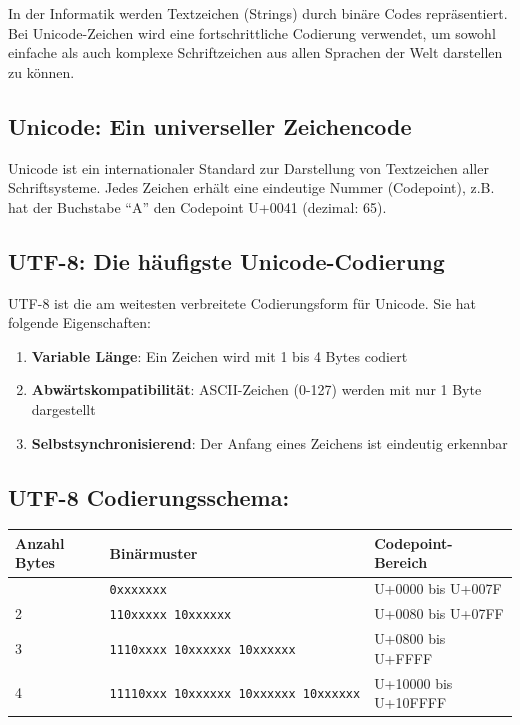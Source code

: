 \documentclass[
  nswissgerman,
  a4paper,
  DIV=11,
  numbers=noendperiod,
  ngerman]{scrreprt}
\newcounter{none} %
\providecommand{\tightlist}{%
  \setlength{\itemsep}{0pt}\setlength{\parskip}{0pt}}
\begin{document}
In der Informatik werden Textzeichen (Strings) durch binäre Codes
repräsentiert. Bei Unicode-Zeichen wird eine fortschrittliche Codierung
verwendet, um sowohl einfache als auch komplexe Schriftzeichen aus allen
Sprachen der Welt darstellen zu können.

\subsection{Unicode: Ein universeller
Zeichencode}\label{unicode-ein-universeller-zeichencode}

Unicode ist ein internationaler Standard zur Darstellung von Textzeichen
aller Schriftsysteme. Jedes Zeichen erhält eine eindeutige Nummer
(Codepoint), z.B. hat der Buchstabe ``A'' den Codepoint U+0041 (dezimal:
65).

\subsection{UTF-8: Die häufigste
Unicode-Codierung}\label{utf-8-die-huxe4ufigste-unicode-codierung}

UTF-8 ist die am weitesten verbreitete Codierungsform für Unicode. Sie
hat folgende Eigenschaften:

\begin{enumerate}
\def\labelenumi{\arabic{enumi}.}
\tightlist
\item
  \textbf{Variable Länge}: Ein Zeichen wird mit 1 bis 4 Bytes codiert
\item
  \textbf{Abwärtskompatibilität}: ASCII-Zeichen (0-127) werden mit nur 1
  Byte dargestellt
\item
  \textbf{Selbstsynchronisierend}: Der Anfang eines Zeichens ist
  eindeutig erkennbar
\end{enumerate}

\subsection{UTF-8 Codierungsschema:}\label{utf-8-codierungsschema}

{\def\LTcaptype{none} %
\begin{longtable}[]{@{}lll@{}}
\toprule\noalign{}
Anzahl Bytes & Binärmuster & Codepoint-Bereich \\
\midrule\noalign{}
\endhead
\bottomrule\noalign{}
\endlastfoot
1 & \texttt{0xxxxxxx} & U+0000 bis U+007F \\
2 & \texttt{110xxxxx\ 10xxxxxx} & U+0080 bis U+07FF \\
3 & \texttt{1110xxxx\ 10xxxxxx\ 10xxxxxx} & U+0800 bis U+FFFF \\
4 & \texttt{11110xxx\ 10xxxxxx\ 10xxxxxx\ 10xxxxxx} & U+10000 bis
U+10FFFF \\
\end{longtable}
}
\end{document}
